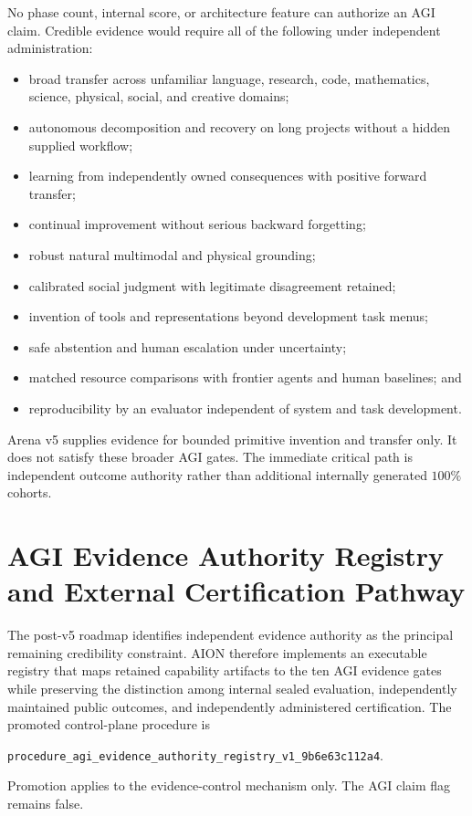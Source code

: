 No phase count, internal score, or architecture feature can authorize an AGI
claim.  Credible evidence would require all of the following under independent
administration:
\begin{itemize}
  \item broad transfer across unfamiliar language, research, code,
        mathematics, science, physical, social, and creative domains;
  \item autonomous decomposition and recovery on long projects without a
        hidden supplied workflow;
  \item learning from independently owned consequences with positive forward
        transfer;
  \item continual improvement without serious backward forgetting;
  \item robust natural multimodal and physical grounding;
  \item calibrated social judgment with legitimate disagreement retained;
  \item invention of tools and representations beyond development task menus;
  \item safe abstention and human escalation under uncertainty;
  \item matched resource comparisons with frontier agents and human baselines;
        and
  \item reproducibility by an evaluator independent of system and task
        development.
\end{itemize}

Arena v5 supplies evidence for bounded primitive invention and transfer only.
It does not satisfy these broader AGI gates.  The immediate critical path is
independent outcome authority rather than additional internally generated
$100\%$ cohorts.



\section{AGI Evidence Authority Registry and External Certification Pathway}
\label{sec:agi-evidence-authority-registry}

The post-v5 roadmap identifies independent evidence authority as the principal
remaining credibility constraint.  AION therefore implements an executable
registry that maps retained capability artifacts to the ten AGI evidence gates
while preserving the distinction among internal sealed evaluation,
independently maintained public outcomes, and independently administered
certification.  The promoted control-plane procedure is
\begin{center}
{\footnotesize
\texttt{procedure\_agi\_evidence\_authority\_registry\_v1\_9b6e63c112a4}}.
\end{center}
Promotion applies to the evidence-control mechanism only.  The AGI claim flag
remains false.


